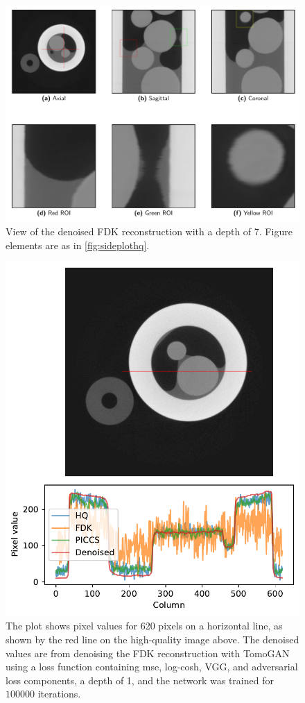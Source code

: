 \begin{figure}[htbp]
  \centering
  \includegraphics[width=.85\textwidth]{figures/kimrobertdepth7-x475y620s250.pdf}
  \caption[Depth=7]{View of the denoised FDK reconstruction with a depth of 7. Figure elements are as in \cref{fig:sideplothq}. }
  \label{fig:sideplotdepth7}
\end{figure}

\begin{figure}[htbp]
  \centering
  \includegraphics[width=.85\textwidth]{figures/kimrobertline.pdf}
  \caption[Line plot]{The plot shows pixel values for 620 pixels on a horizontal line, as shown by the red line on the high-quality image above. The denoised values are from denoising the FDK reconstruction with TomoGAN using a loss function containing \acrshort{mse}, log-cosh, VGG, and adversarial loss components, a depth of 1, and the network was trained for $100 000$ iterations. }
  \label{fig:kimrobertline}
\end{figure}


